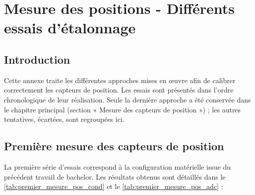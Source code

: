 \chapter{Mesure des positions - Différents essais d'étalonnage}
\label{annexe:MesPos}

\section{Introduction}
Cette annexe traite les différentes approches mises en œuvre afin de calibrer correctement les capteurs de position. Les essais sont présentés dans l'ordre chronologique de leur réalisation. Seule la dernière approche a été conservée dans le chapitre principal (section « Mesure des capteurs de position ») ; les autres tentatives, écartées, sont regroupées ici.

\section{Première mesure des capteurs de position}
La première série d'essais correspond à la configuration matérielle issue du précédent travail de bachelor. Les résultats obtenus sont détaillés dans le \autoref{tab:premier_mesure_pos_cond} et le \autoref{tab:premier_mesure_pos_adc} :

